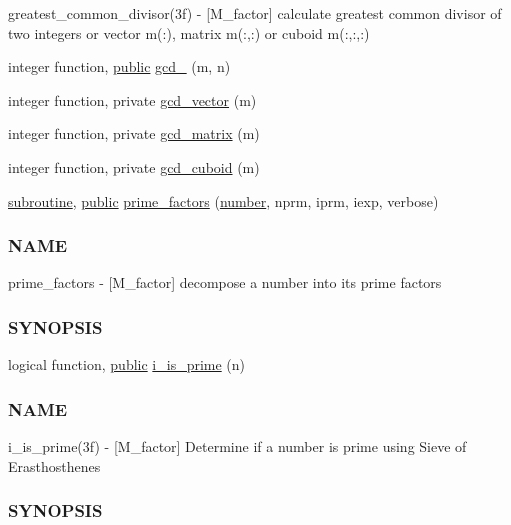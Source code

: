 \begin{DoxyCompactItemize}
\begin{DoxyCompactList}
greatest\+\_\+common\+\_\+divisor(3f) -\/ \mbox{[}M\+\_\+factor\mbox{]} calculate greatest common divisor of two integers or vector m(\+:), matrix m(\+:,\+:) or cuboid m(\+:,\+:,\+:) \end{DoxyCompactList}\item 
integer function, \hyperlink{M__stopwatch_83_8txt_a2f74811300c361e53b430611a7d1769f}{public} \hyperlink{namespacem__factor_aed74f995a7c71e8cec13964b82457403}{gcd\+\_} (m, n)
\item 
integer function, private \hyperlink{namespacem__factor_a60713d4c44895b4c18d4d6d9449ceaf7}{gcd\+\_\+vector} (m)
\item 
integer function, private \hyperlink{namespacem__factor_a6edfef428cb51a2cbe97cfb0ad25da8b}{gcd\+\_\+matrix} (m)
\item 
integer function, private \hyperlink{namespacem__factor_aff0e6f81edd8efc0fe41822916fb4efa}{gcd\+\_\+cuboid} (m)
\item 
\hyperlink{M__stopwatch_83_8txt_acfbcff50169d691ff02d4a123ed70482}{subroutine}, \hyperlink{M__stopwatch_83_8txt_a2f74811300c361e53b430611a7d1769f}{public} \hyperlink{namespacem__factor_a6440013d17b820fa65096b34f21d367d}{prime\+\_\+factors} (\hyperlink{what__overview_81_8txt_a5168680dcac08de182f59de9a12c38ae}{number}, nprm, iprm, iexp, verbose)
\begin{DoxyCompactList}\small\item\em \subsubsection*{N\+A\+ME}

prime\+\_\+factors -\/ \mbox{[}M\+\_\+factor\mbox{]} decompose a number into its prime factors \subsubsection*{S\+Y\+N\+O\+P\+S\+IS}\end{DoxyCompactList}\item 
logical function, \hyperlink{M__stopwatch_83_8txt_a2f74811300c361e53b430611a7d1769f}{public} \hyperlink{namespacem__factor_afcca43d3d524f6d11d54bbfd475e60d5}{i\+\_\+is\+\_\+prime} (n)
\begin{DoxyCompactList}\small\item\em \subsubsection*{N\+A\+ME}

i\+\_\+is\+\_\+prime(3f) -\/ \mbox{[}M\+\_\+factor\mbox{]} Determine if a number is prime using Sieve of Erasthosthenes \subsubsection*{S\+Y\+N\+O\+P\+S\+IS}\end{DoxyCompactList}\end{DoxyCompactItemize}
